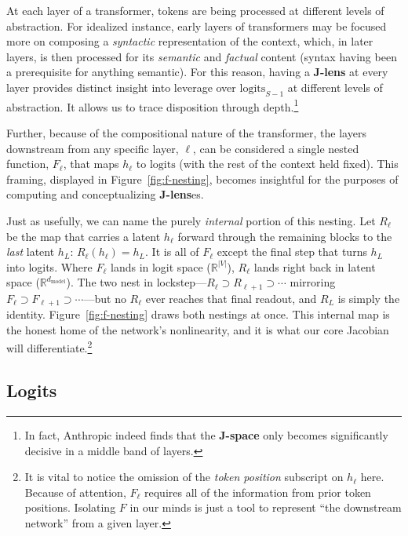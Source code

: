 \documentclass{article}
\newcommand{\logits}{\mathrm{logits}}
\newcommand{\dmodel}{d_{\text{model}}}
\begin{document}
At each layer of a transformer, tokens are being processed at different levels of abstraction. For idealized instance, early layers of transformers may be focused more on composing a \textit{syntactic} representation of the context, which, in later layers, is then processed for its \textit{semantic} and \textit{factual} content (syntax having been a prerequisite for anything semantic). For this reason, having a \textbf{J-lens} at every layer provides distinct insight into leverage over \(\logits_{S-1}\) at different levels of abstraction. It allows us to trace disposition through depth.\footnote{In fact, Anthropic indeed finds that the \textbf{J-space} only becomes significantly decisive in a middle band of layers.}

Further, because of the compositional nature of the transformer, the layers downstream from any specific layer, \(\ell\), can be considered a single nested function, \(F_\ell\), that maps \(h_{\ell}\) to \(\logits\) (with the rest of the context held fixed). This framing, displayed in Figure~\ref{fig:f-nesting}, becomes insightful for the purposes of computing and conceptualizing \textbf{J-lens}es.

Just as usefully, we can name the purely \textit{internal} portion of this nesting. Let \(R_\ell\) be the map that carries a latent \(h_\ell\) forward through the remaining blocks to the \textit{last} latent \(h_L\): \(R_\ell(h_\ell) = h_L\). It is all of \(F_\ell\) except the final step that turns \(h_L\) into logits. Where \(F_\ell\) lands in logit space (\(\mathbb{R}^{|V|}\)), \(R_\ell\) lands right back in latent space (\(\mathbb{R}^{\dmodel}\)). The two nest in lockstep---\(R_\ell \supset R_{\ell+1} \supset \cdots\) mirroring \(F_\ell \supset F_{\ell+1} \supset \cdots\)---but no \(R_\ell\) ever reaches that final readout, and \(R_L\) is simply the identity. Figure~\ref{fig:f-nesting} draws both nestings at once. This internal map is the honest home of the network's nonlinearity, and it is what our core Jacobian will differentiate.\footnote{It is vital to notice the omission of the \textit{token position} subscript on \(h_\ell\) here. Because of attention, \(F_\ell\) requires all of the information from prior token positions. Isolating \(F\) in our minds is just a tool to represent ``the downstream network'' from a given layer.}

\subsection{Logits}
\end{document}
